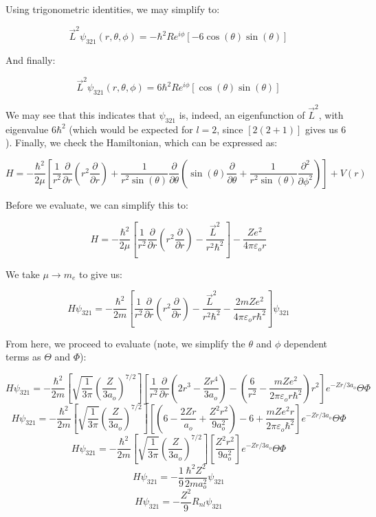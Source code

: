 \begin{enumerate}
    Using trigonometric identities, we may simplify to:

    $$\vec{L}^2\psi_{321}(r,\theta,\phi)=-\hbar^2Re^{i\phi}\left[ -6\cos(\theta)\sin(\theta)\right]$$

    And finally:

    $$\vec{L}^2\psi_{321}(r,\theta,\phi)=6\hbar^2Re^{i\phi}\left[ \cos(\theta)\sin(\theta)\right]$$
    
    We may see that this indicates that $\psi_{321}$ is, indeed, an eigenfunction of $\vec{L}^2$, with eigenvalue $6\hbar^2$ (which would be expected for $l=2$, since $[2(2+1)]$ gives us $6$). Finally, we check the Hamiltonian, which can be expressed as:

    $$H=-\frac{\hbar^2}{2\mu}\left[ \frac{1}{r^2}\frac{\partial}{\partial r}\left( r^2\frac{\partial}{\partial r} \right)+\frac{1}{r^2\sin(\theta)}\frac{\partial}{\partial \theta}\left( \sin(\theta)\frac{\partial}{\partial\theta}+\frac{1}{r^2\sin(\theta)}\frac{\partial^2}{\partial\phi^2} \right) \right] + V(r)$$

    Before we evaluate, we can simplify this to:

    $$H=-\frac{\hbar^2}{2\mu}\left[ \frac{1}{r^2}\frac{\partial}{\partial r}\left( r^2\frac{\partial}{\partial r}\right) -\frac{\vec{L}^2}{r^2\hbar^2}\right]-\frac{Ze^2}{4\pi\varepsilon_or}$$

    We take $\mu\to m_e$ to give us:

    $$H\psi_{321}=-\frac{\hbar^2}{2m}\left[ \frac{1}{r^2}\frac{\partial}{\partial r}\left( r^2\frac{\partial}{\partial r}\right) -\frac{\vec{L}^2}{r^2\hbar^2}-\frac{2mZe^2}{4\pi\varepsilon_or\hbar^2}\right]\psi_{321}$$

    From here, we proceed to evaluate (note, we simplify the $\theta$ and $\phi$ dependent terms as $\Theta$ and $\Phi$):

    $$H\psi_{321}=-\frac{\hbar^2}{2m}\left[ \sqrt{\frac{1}{3\pi}}\left( \frac{Z}{3a_o} \right)^{7/2}\right]\left[ \frac{1}{r^2}\frac{\partial}{\partial r}\left( 2r^3-\frac{Zr^4}{3a_o} \right)-\left( \frac{6}{r^2}-\frac{mZe^2}{2\pi\varepsilon_or\hbar^2} \right)r^2 \right]e^{-Zr/3a_o}\Theta\Phi$$
    $$H\psi_{321}=-\frac{\hbar^2}{2m}\left[ \sqrt{\frac{1}{3\pi}}\left( \frac{Z}{3a_o} \right)^{7/2}\right]\left[ \left( 6-\frac{2Zr}{a_o}+\frac{Z^2r^2}{9a_o^2} \right)-6+\frac{mZe^2r}{2\pi\varepsilon_o\hbar^2} \right]e^{-Zr/3a_o}\Theta\Phi$$
  $$H\psi_{321}=-\frac{\hbar^2}{2m}\left[ \sqrt{\frac{1}{3\pi}}\left( \frac{Z}{3a_o} \right)^{7/2}\right]\left[ \frac{Z^2r^2}{9a_o^2} \right]e^{-Zr/3a_o}\Theta\Phi$$
  $$H\psi_{321}=-\frac{1}{9}\frac{\hbar^2Z^2}{2ma_o^2}\psi_{321}$$
  $$\boxed{H\psi_{321}=-\frac{Z^2}{9}R_{nl}\psi_{321}}$$


\end{enumerate}
